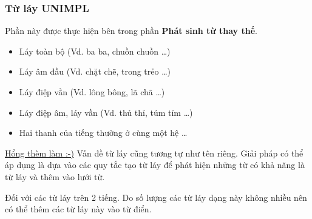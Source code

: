 \documentclass[a4paper,oneside]{book} %
\newcommand{\note}[1]{\underline{#1}}
\begin{document}

\subsubsection{Từ láy UNIMPL}

Phần này được thực hiện bên trong phần \textbf{Phát sinh từ thay thế}.

\begin{itemize}
\item Láy toàn bộ (Vd. ba ba, chuồn chuồn \ldots)
\item Láy âm đầu (Vd. chặt chẽ, trong trẻo \ldots)
\item Láy điệp vần (Vd. lông bông, lã chã \ldots)
\item Láy điệp âm, láy vần (Vd. thủ thỉ, tủm tỉm \ldots)
\item Hai thanh của tiếng thường ở cùng một hệ \ldots
\end{itemize}

\note{Hổng thèm làm :-)} Vấn đề từ láy cũng tương tự như  tên riêng. Giải
pháp có thể áp dụng là dựa vào các quy tắc tạo từ láy để phát hiện
những từ có khả năng là từ láy và thêm vào lưới từ. 

Đối với các từ láy trên 2 tiếng. Do số lượng các từ láy dạng này không
nhiều nên có thể thêm các từ láy này vào từ điển.
\end{document}
